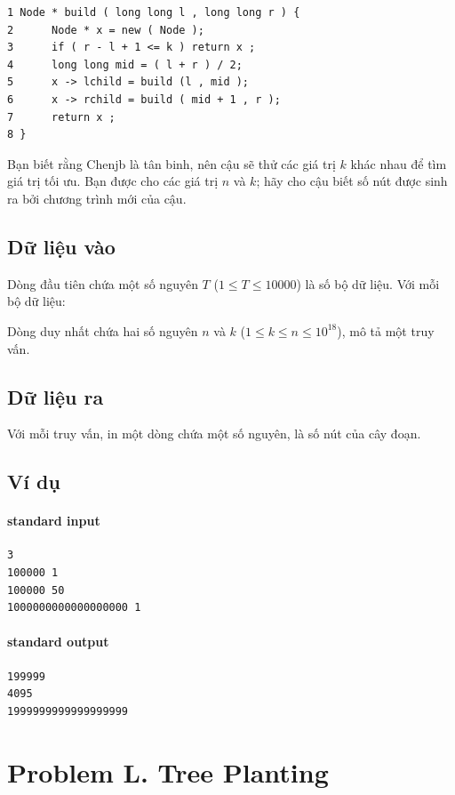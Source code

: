 \documentclass[11pt]{article}
\begin{document}
\begin{verbatim}
1 Node * build ( long long l , long long r ) {
2      Node * x = new ( Node );
3      if ( r - l + 1 <= k ) return x ;
4      long long mid = ( l + r ) / 2;
5      x -> lchild = build (l , mid );
6      x -> rchild = build ( mid + 1 , r );
7      return x ;
8 }
\end{verbatim}

Bạn biết rằng Chenjb là tân binh, nên cậu sẽ thử các giá trị \(k\) khác nhau
để tìm giá trị tối ưu. Bạn được cho các giá trị \(n\) và \(k\); hãy cho cậu
biết số nút được sinh ra bởi chương trình mới của cậu.

\subsection*{Dữ liệu vào}

Dòng đầu tiên chứa một số nguyên \(T\) (\(1\le T\le 10000\)) là số bộ dữ
liệu. Với mỗi bộ dữ liệu:

Dòng duy nhất chứa hai số nguyên \(n\) và \(k\)
(\(1\le k\le n\le 10^{18}\)), mô tả một truy vấn.

\subsection*{Dữ liệu ra}

Với mỗi truy vấn, in một dòng chứa một số nguyên, là số nút của cây đoạn.

\subsection*{Ví dụ}

\paragraph{standard input}
\begin{verbatim}
3
100000 1
100000 50
1000000000000000000 1
\end{verbatim}

\paragraph{standard output}
\begin{verbatim}
199999
4095
1999999999999999999
\end{verbatim}

\section{Problem L. Tree Planting}
\end{document}
